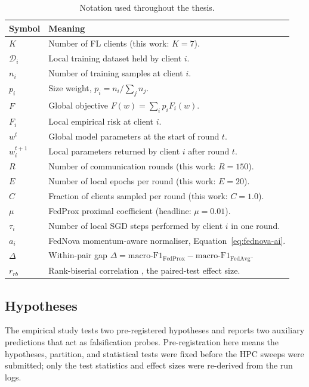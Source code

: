 \documentclass[11pt,a4paper]{article}
\begin{document}
\begin{table}[h]
\centering
\small
\caption{Notation used throughout the thesis.}
\label{tab:notation}
\begin{tabular}{l p{}}
\toprule
Symbol & Meaning \\
\midrule
$K$               & Number of FL clients (this work: $K=7$). \\
$\mathcal{D}_i$   & Local training dataset held by client $i$. \\
$n_i$             & Number of training samples at client $i$. \\
$p_i$             & Size weight, $p_i = n_i / \sum_{j} n_j$. \\
$F$               & Global objective $F(w) = \sum_i p_i F_i(w)$. \\
$F_i$             & Local empirical risk at client $i$. \\
$w^t$             & Global model parameters at the start of round $t$. \\
$w_i^{t+1}$       & Local parameters returned by client $i$ after round $t$. \\
$R$               & Number of communication rounds (this work: $R=150$). \\
$E$               & Number of local epochs per round (this work: $E=20$). \\
$C$               & Fraction of clients sampled per round (this work: $C=1.0$). \\
$\mu$             & FedProx proximal coefficient (headline: $\mu=0.01$). \\
$\tau_i$          & Number of local SGD steps performed by client $i$ in one round. \\
$a_i$             & FedNova momentum-aware normaliser, Equation~\ref{eq:fednova-ai}. \\
$\Delta$          & Within-pair gap $\Delta = \mathrm{macro\text{-}F1}_{\mathrm{FedProx}} - \mathrm{macro\text{-}F1}_{\mathrm{FedAvg}}$. \\
$r_{rb}$          & Rank-biserial correlation \citep{kerby2014rankbiserial}, the paired-test effect size. \\
\bottomrule
\end{tabular}
\end{table}

\subsection{Hypotheses}\label{sec:hypotheses}
The empirical study tests two pre-registered hypotheses and reports two
auxiliary predictions that act as falsification probes. Pre-registration here
means the hypotheses, partition, and statistical tests were fixed before the
HPC sweeps were submitted; only the test statistics and effect sizes were
re-derived from the run logs.
\end{document}

